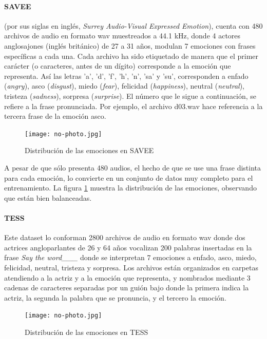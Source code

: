 \documentclass[11pt,a4paper,spanish]{book}
\begin{document}
	\paragraph{SAVEE} (por sus siglas en inglés, \emph{ Surrey Audio-Visual Expressed Emotion}), cuenta con 480 archivos de audio en formato wav muestreados a 44.1 kHz, donde 4 actores anglosajones (inglés británico) de 27 a 31 años, modulan 7 emociones con frases específicas a cada una.
	Cada archivo ha sido etiquetado de manera que el primer carácter (o caracteres, antes de un dígito) corresponde a la emoción que representa. Así las letras 'a', 'd', 'f', 'h', 'n', 'sa' y 'su', corresponden a enfado (\emph{angry}), asco (\emph{disgust}), miedo (\emph{fear}), felicidad (\emph{happiness}), neutral (\emph{neutral}), tristeza (\emph{sadness}), sorpresa (\emph{surprise}). El número que le sigue a continuación, se refiere a la frase pronunciada. Por ejemplo, el archivo d03.wav hace referencia a la tercera frase de la emoción asco.
	
	\begin{figure}[H]
		\centering
		\texttt{[image: no-photo.jpg]} 
		\caption{Distribución de las emociones en SAVEE}
		\label{fig:emociones_savee}
	\end{figure}
	
	A pesar de que sólo presenta 480 audios, el hecho de que se use una frase distinta para cada emoción, lo convierte en un conjunto de datos muy completo para el entrenamiento. La figura \ref{fig:emociones_savee} muestra la distribución de las emociones, observando que están bien balanceadas.

	\paragraph{TESS}
	Este dataset lo conforman 2800 archivos de audio en formato wav donde dos actrices angloparlantes de 26 y 64 años vocalizan 200 palabras insertadas en la frase \emph{Say the word\_\_\_} donde se interpretan 7 emociones a enfado, asco, miedo, felicidad, neutral, tristeza y sorpresa. Los archivos están organizados en carpetas atendiendo a la actriz y a la emoción que representa, y nombrados mediante 3 cadenas de caracteres separadas por un guión bajo donde la primera indica la actriz, la segunda la palabra que se pronuncia, y el tercero la emoción.
	
	\begin{figure}[H]
		\centering
		\texttt{[image: no-photo.jpg]} 
		\caption{Distribución de las emociones en TESS}
		\label{fig:emociones_tess}
	\end{figure}
\end{document}
